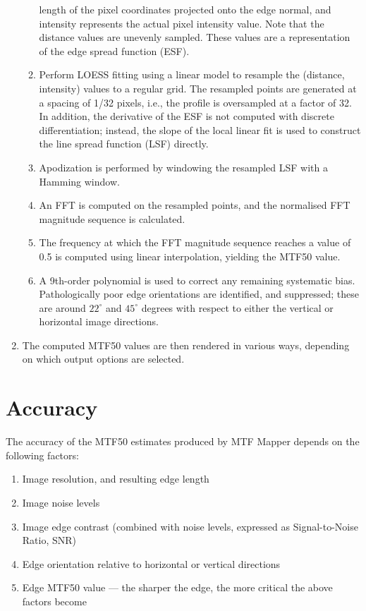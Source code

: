 \documentclass[a4paper]{article}
\begin{document}
\begin{enumerate}
\begin{enumerate}
length of the pixel coordinates projected onto the edge normal, and
\textsf{intensity} represents the actual pixel intensity value. Note that
the distance values are unevenly sampled. These values are a representation
of the edge spread function (ESF).
	  \item Perform LOESS fitting using a linear model to resample the 
(\textsf{distance}, \textsf{intensity}) values to a regular grid. The
resampled points are generated at a spacing of 1/32 pixels, i.e., the
profile is oversampled at a factor of 32. In addition, the derivative of the
ESF is not computed with discrete differentiation; instead, the slope of the
local linear fit is used to construct the line spread function (LSF) directly.
	  \item Apodization is performed by windowing the resampled LSF with
a Hamming window.
	  \item An FFT is computed on the resampled points, and the
normalised FFT magnitude sequence is calculated.
	  \item The frequency at which the FFT magnitude sequence reaches a
value of 0.5 is computed using linear interpolation, yielding the MTF50
value.
	  \item A 9th-order polynomial is used to correct any remaining
systematic bias. Pathologically poor edge orientations are identified, and
suppressed; these are around $22^\circ$ and $45^\circ$ degrees with respect
to either the vertical or horizontal image directions.
	\end{enumerate}
    \item The computed MTF50 values are then rendered in various ways,
depending on which output options are selected.
\end{enumerate}

\section{Accuracy}
\label{sec:accuracy}
The accuracy of the MTF50 estimates produced by MTF Mapper depends on the
following factors:
\begin{enumerate}
  \item Image resolution, and resulting edge length
  \item Image noise levels
  \item Image edge contrast (combined with noise levels, expressed as
  Signal-to-Noise Ratio, SNR)
  \item Edge orientation relative to horizontal or vertical directions
  \item Edge MTF50 value --- the sharper the edge, the more critical the
  above factors become
\end{enumerate}
\end{document}
